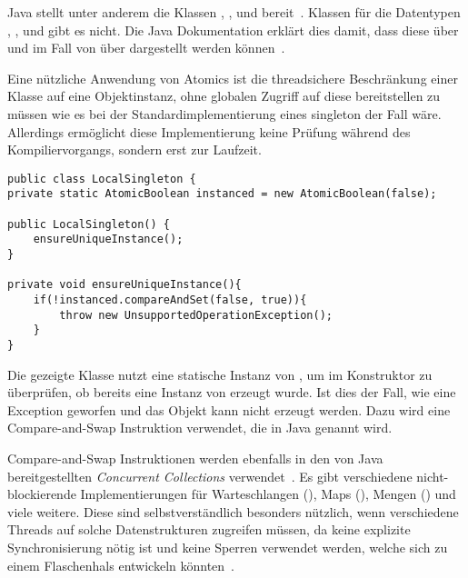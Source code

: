 Java stellt unter anderem die Klassen , ,  und 
bereit~\cite[S.~131]{Friesen2015}. Klassen für die Datentypen , ,  und  gibt es nicht. Die Java Dokumentation erklärt dies damit, dass diese über  und im Fall von  über  dargestellt werden können~\cite{Java7DocAtomic}.

Eine nützliche Anwendung von Atomics ist die threadsichere Beschränkung einer Klasse auf eine Objektinstanz, ohne globalen Zugriff auf diese bereitstellen zu müssen wie es bei der Standardimplementierung eines \gls{singleton} der Fall wäre. Allerdings ermöglicht diese Implementierung keine Prüfung während des Kompiliervorgangs, sondern erst zur Laufzeit.
\begin{lstlisting}
public class LocalSingleton {
private static AtomicBoolean instanced = new AtomicBoolean(false);

public LocalSingleton() {
	ensureUniqueInstance();
}

private void ensureUniqueInstance(){
	if(!instanced.compareAndSet(false, true)){
		throw new UnsupportedOperationException();
	}
}
\end{lstlisting}
Die gezeigte Klasse  nutzt eine statische Instanz von , um im Konstruktor zu überprüfen, ob bereits eine Instanz von  erzeugt wurde. Ist dies der Fall, wie eine Exception geworfen und das Objekt kann nicht erzeugt werden. Dazu wird eine Compare-and-Swap Instruktion verwendet, die in Java  genannt wird.

Compare-and-Swap Instruktionen werden ebenfalls in den von Java bereitgestellten \emph{Concurrent Collections} verwendet~\cite[S. 133~f.]{Friesen2015}. Es gibt verschiedene nicht-blockierende Implementierungen für Warteschlangen (), Maps (), Mengen () und viele weitere. Diese sind selbstverständlich besonders nützlich, wenn verschiedene Threads auf solche Datenstrukturen zugreifen müssen, da keine explizite Synchronisierung nötig ist und keine Sperren verwendet werden, welche sich zu einem Flaschenhals entwickeln könnten~\cite[S.~125~ff.]{Friesen2015}.

